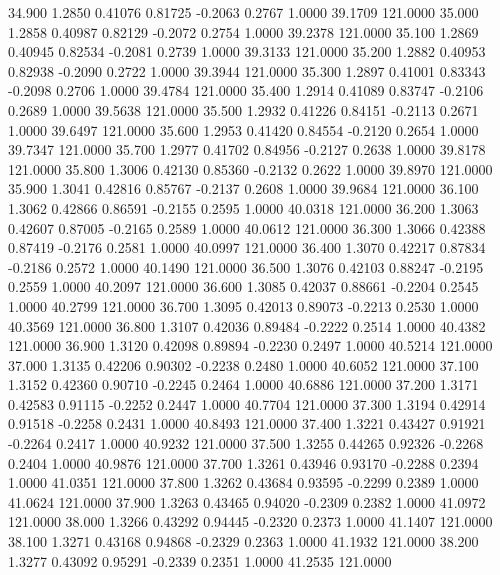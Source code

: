   34.900   1.2850   0.41076   0.81725  -0.2063   0.2767   1.0000  39.1709 121.0000
  35.000   1.2858   0.40987   0.82129  -0.2072   0.2754   1.0000  39.2378 121.0000
  35.100   1.2869   0.40945   0.82534  -0.2081   0.2739   1.0000  39.3133 121.0000
  35.200   1.2882   0.40953   0.82938  -0.2090   0.2722   1.0000  39.3944 121.0000
  35.300   1.2897   0.41001   0.83343  -0.2098   0.2706   1.0000  39.4784 121.0000
  35.400   1.2914   0.41089   0.83747  -0.2106   0.2689   1.0000  39.5638 121.0000
  35.500   1.2932   0.41226   0.84151  -0.2113   0.2671   1.0000  39.6497 121.0000
  35.600   1.2953   0.41420   0.84554  -0.2120   0.2654   1.0000  39.7347 121.0000
  35.700   1.2977   0.41702   0.84956  -0.2127   0.2638   1.0000  39.8178 121.0000
  35.800   1.3006   0.42130   0.85360  -0.2132   0.2622   1.0000  39.8970 121.0000
  35.900   1.3041   0.42816   0.85767  -0.2137   0.2608   1.0000  39.9684 121.0000
  36.100   1.3062   0.42866   0.86591  -0.2155   0.2595   1.0000  40.0318 121.0000
  36.200   1.3063   0.42607   0.87005  -0.2165   0.2589   1.0000  40.0612 121.0000
  36.300   1.3066   0.42388   0.87419  -0.2176   0.2581   1.0000  40.0997 121.0000
  36.400   1.3070   0.42217   0.87834  -0.2186   0.2572   1.0000  40.1490 121.0000
  36.500   1.3076   0.42103   0.88247  -0.2195   0.2559   1.0000  40.2097 121.0000
  36.600   1.3085   0.42037   0.88661  -0.2204   0.2545   1.0000  40.2799 121.0000
  36.700   1.3095   0.42013   0.89073  -0.2213   0.2530   1.0000  40.3569 121.0000
  36.800   1.3107   0.42036   0.89484  -0.2222   0.2514   1.0000  40.4382 121.0000
  36.900   1.3120   0.42098   0.89894  -0.2230   0.2497   1.0000  40.5214 121.0000
  37.000   1.3135   0.42206   0.90302  -0.2238   0.2480   1.0000  40.6052 121.0000
  37.100   1.3152   0.42360   0.90710  -0.2245   0.2464   1.0000  40.6886 121.0000
  37.200   1.3171   0.42583   0.91115  -0.2252   0.2447   1.0000  40.7704 121.0000
  37.300   1.3194   0.42914   0.91518  -0.2258   0.2431   1.0000  40.8493 121.0000
  37.400   1.3221   0.43427   0.91921  -0.2264   0.2417   1.0000  40.9232 121.0000
  37.500   1.3255   0.44265   0.92326  -0.2268   0.2404   1.0000  40.9876 121.0000
  37.700   1.3261   0.43946   0.93170  -0.2288   0.2394   1.0000  41.0351 121.0000
  37.800   1.3262   0.43684   0.93595  -0.2299   0.2389   1.0000  41.0624 121.0000
  37.900   1.3263   0.43465   0.94020  -0.2309   0.2382   1.0000  41.0972 121.0000
  38.000   1.3266   0.43292   0.94445  -0.2320   0.2373   1.0000  41.1407 121.0000
  38.100   1.3271   0.43168   0.94868  -0.2329   0.2363   1.0000  41.1932 121.0000
  38.200   1.3277   0.43092   0.95291  -0.2339   0.2351   1.0000  41.2535 121.0000
